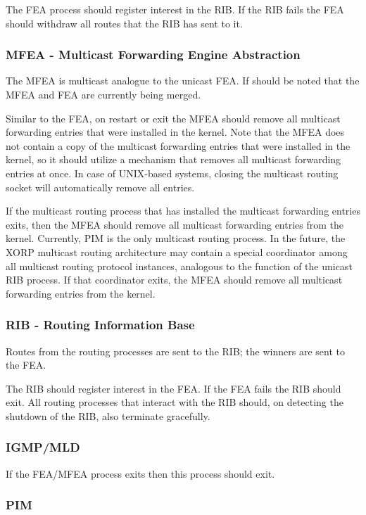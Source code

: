 \documentclass[11pt]{article}
\begin{document}
The FEA process should register interest in the RIB. If the RIB fails
the FEA should withdraw all routes that the RIB has sent to it.

\subsubsection{MFEA - Multicast Forwarding Engine Abstraction}

The MFEA is multicast analogue to the unicast FEA. If should be noted
that the MFEA and FEA are currently being merged.

Similar to the FEA, on restart or exit the MFEA should remove all
multicast forwarding entries that were installed in the kernel. Note
that the MFEA does not contain a copy of the multicast forwarding entries
that were installed in the kernel, so it should utilize a
mechanism that removes all multicast forwarding entries at once.  In
case of UNIX-based systems, closing the multicast routing socket will
automatically remove all entries.

If the multicast routing process that has installed the multicast
forwarding entries exits, then the MFEA should remove all multicast
forwarding entries from the kernel. Currently, PIM is the only
multicast routing process. In the future, the XORP multicast routing
architecture may contain a special coordinator among all multicast
routing protocol instances, analogous to the function of the unicast
RIB process. If that coordinator exits, the MFEA should remove all
multicast forwarding entries from the kernel.

\subsubsection{RIB - Routing Information Base}

Routes from the routing processes are sent to the RIB; the winners are
sent to the FEA.

The RIB should register interest in the FEA. If the FEA fails the RIB
should exit. All routing processes that interact with the RIB should,
on detecting the shutdown of the RIB, also terminate gracefully.

\subsubsection{IGMP/MLD}

If the FEA/MFEA process exits then this process should exit.

\subsubsection{PIM}
\end{document}
